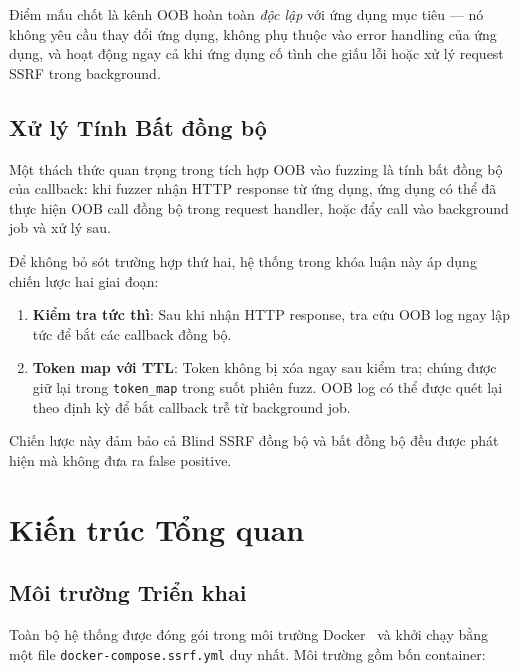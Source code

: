 Điểm mấu chốt là kênh OOB hoàn toàn \emph{độc lập} với ứng dụng mục tiêu
--- nó không yêu cầu thay đổi ứng dụng, không phụ thuộc vào error handling
của ứng dụng, và hoạt động ngay cả khi ứng dụng cố tình che giấu lỗi hoặc
xử lý request SSRF trong background.

\subsection{Xử lý Tính Bất đồng bộ}
\label{subsec:oob-async}

Một thách thức quan trọng trong tích hợp OOB vào fuzzing là tính bất đồng bộ
của callback: khi fuzzer nhận HTTP response từ ứng dụng, ứng dụng có thể đã
thực hiện OOB call đồng bộ trong request handler, hoặc đẩy call vào background
job và xử lý sau.

Để không bỏ sót trường hợp thứ hai, hệ thống trong khóa luận này áp dụng
chiến lược hai giai đoạn:
\begin{enumerate}
    \item \textbf{Kiểm tra tức thì}: Sau khi nhận HTTP response, tra cứu
    OOB log ngay lập tức để bắt các callback đồng bộ.
    \item \textbf{Token map với TTL}: Token không bị xóa ngay sau kiểm tra;
    chúng được giữ lại trong \texttt{token\_map} trong suốt phiên fuzz. OOB
    log có thể được quét lại theo định kỳ để bắt callback trễ từ background
    job.
\end{enumerate}

Chiến lược này đảm bảo cả Blind SSRF đồng bộ và bất đồng bộ đều được phát
hiện mà không đưa ra false positive.

\section{Kiến trúc Tổng quan}
\label{sec:arch}

\subsection{Môi trường Triển khai}

Toàn bộ hệ thống được đóng gói trong môi trường Docker~\cite{docker2023}
và khởi chạy bằng một file \texttt{docker-compose.ssrf.yml} duy nhất. Môi
trường gồm bốn container:

